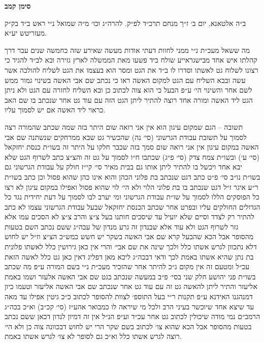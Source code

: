 \documentclass[12pt, openany]{book}
\newcommand{\chapname}{}
\newcommand{\newchap}[1]{
	\addcontentsline{toc}{chapter}{#1}
	\renewcommand{\chapname}{#1}
		\begin{center}
			\textbf{%
\fontsize{16pt}{16pt}\selectfont
				#1}
		\end{center}
}
\begin{document}
\newchap{סימן קמב}
\begin{multicols}{2}
ב״ה אלטאנא, יום ב׳ ז״ך מנחם תרכ״ד לפ״ק. להרה״ג וכו׳ מ״ה שמואל נ״י ראש ב״ד בק״ק מעזריטש יע״א.\\\vspace{0pt}

מה ששאל מעכ״ת נ״י ממני לחוות דעתי אודות מעשה שאירע שזה כחמשה שנים עבר דרך קהלתו איש אחד מבישגראייע שולח ביד פשעו מאת הממשלה לארץ גזירה ובא לב״ד להגיד כי רצונו לשלוח גט לאשתו וסדרו לו ב״ד את הגט ומסר הוא בעצמו את הגט לשליח להולכה אשר עשה ובבא השליח עם הגט למקום האשה ראו כי נכתב שם אבי האשה בשינוי גמור ממש לשם אחר והשינוי הי׳ ע״פ הבעל כי הוא צוה לכתוב כן ובא השליח לחזרה עם הגט ולא ניתן הגט ליד האשה ומורה אחד רוצה להתיר ליתן הגט הזה עם עוד גט אחר שנכתב בו שם האב כראוי ליד האשה אם יש לסמוך עליו.\\\vspace{0pt}

תשובה – הגם שמקום עיגון הוא אין אני רואה שום היתר בזה שמה שכתב שהמורה רצה לסמוך על תשובת עבודת הגרשוני (סי׳ נה) שהכשיר גט שבא ממרחקים שנשתנה שם אבי האשה במקום עיגון אין אני רואה שום סמך בזה שכבר חלקו על היתר זה בשו״ת כנסת יחזקאל (סי׳ ע׳) ובשו״ת צמח צדק (סי׳ פ״ג) שכתבו ח״ו לסמוך על גט זה והצ״צ כתב לשרוף הגט שלא יבא אחד ויכשל בו להתיר ליתן אותו גם בבית מאיר סי׳ קי״ז חולק על עבודת הגרשוני גם בשו״ת נו״ב סי׳ פ״ט כתב דגט שנכתב בת פלוני הכהן והוא אינו כהן שהוא פסול וכן כתב בשו״ת ר״ע איגר ז״ל דגט שנכתב בו בת פלוני הלוי ולא הי׳ לוי שהוא פסול ואפילו במקום עיגון לא רצו כל הפוסקים הללו לסמוך על שו״ת עבודת הגרשוני ומי יערב לבו לסמוך על דעת יחידית נגד כל הגדולים החולקים עליו ובפרט אחר שכתב הכנסת יחזקאל שבעל עבודת הגרשוני עצמו לא כתב להתיר רק לצדד וסיים שלא יועיל עד שיסכים חותנו בעל צ״צ והרב צ״צ לא הסכים עמו אלא גזר לשרוף הגט ולא עוד אלא שבנדון זה גרע מנדון של עבה״ג ששם נכתב השם בטעות מהסופר אבל הכא שהבעל קרא שם אבי האשה בשקר יש חשש כמש״כ הצ״צ וז״ל יש לחוש דלא נתכוון לגרש אשתו כלל ולכך שינה את שם אבי׳ והרי אין כאן גירושין כלל לאשתו פלונית בת נתן שהיא אשתו באמת לכך ודאי דבכה״ג ליכא מאן דפליג דאין כאן גט כלל לאשה הזאת עכ״ל ומטעם זה אין מקום ג״כ להיתר אחר שהזכיר מעכ״ת נ״י בשם המורה ע״פ מה שכתב בשו״ת פני יהושע חלק שני בסי׳ פ״ב במעשה שנכתב בגט שם אבי האשה אלעזר ושמו באמת אליעזר והתיר ליתן להאשה גט זה עם עוד גט אחר שנכתב שם אבי האשה אליעזר וטעמו כיון דמנהגנו האידנא ע״פ תקנות ר״י בעל התוספ׳ לצוות להסופר לכתוב כ״כ גיטין אפילו עד מאה עד שיצא אחד שיוכשר בעיני הרב ולכל מי שיראה לו כמבואר אהע״ז (סי׳ קכ״ב) וא״כ בכה״ג הרמב״ם נמי מודה שיכולין לכתוב גט אחר עכ״ד וע״פ הנ״ל אין זה דמיון לנדון דכאן ששם נכתב בטעות מהסופר אבל הכא שהוא צו׳ לכתוב בשם שקר הרי יש לחוש דבכוונה צוה כן ולא הי׳ רוצה לגרש אשתו כלל וא״כ גם לסופר לא צו׳ לגרש אשתו באמת.\\\vspace{0pt}


\end{multicols}
\end{document}
